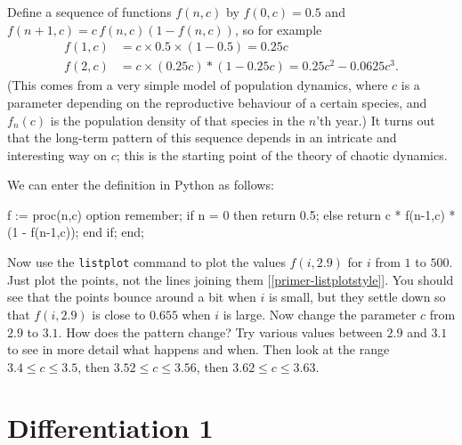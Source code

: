 \documentclass[a4paper,10pt]{amsbook}
\begin{document}
\begin{exercise}
 Define a sequence of functions $f(n,c)$ by $f(0,c)=0.5$ and
 $f(n+1,c)=c\,f(n,c)(1-f(n,c))$, so for example
 \begin{align*}
  f(1,c) &= c\times 0.5 \times (1-0.5) = 0.25 c \\
  f(2,c) &= c \times (0.25 c) * (1-0.25c) = 0.25c^2 - 0.0625 c^3. 
 \end{align*}
 (This comes from a very simple model of population dynamics, where
 $c$ is a parameter depending on the reproductive behaviour of a
 certain species, and $f_n(c)$ is the population density of that
 species in the $n$'th year.)  It turns out that the long-term
 pattern of this sequence depends in an intricate and interesting way
 on $c$; this is the starting point of the theory of chaotic
 dynamics. 

 We can enter the definition in Python as follows:
\begin{pcodeblock}
 f := proc(n,c)
  option remember;
  if n = 0 then
   return 0.5;
  else 
   return c * f(n-1,c) * (1 - f(n-1,c));
  end if;
 end;
\end{pcodeblock}
 Now use the \verb~listplot~ command to plot the values $f(i,2.9)$
 for $i$ from $1$ to $500$.  Just plot the points, not the lines
 joining them [\ref{primer-listplotstyle}].  You should see that the
 points bounce around a bit when $i$ is small, but they settle down so
 that $f(i,2.9)$ is close to $0.655$ when $i$ is large.  Now change
 the parameter $c$ from $2.9$ to $3.1$.  How does the pattern change?
 Try various values between $2.9$ and $3.1$ to see in more detail what
 happens and when.  Then look at the range $3.4\leq c\leq 3.5$, then
 $3.52\leq c\leq 3.56$, then $3.62\leq c\leq 3.63$. 

\end{exercise}

\chapter{Differentiation 1}
\end{document}
